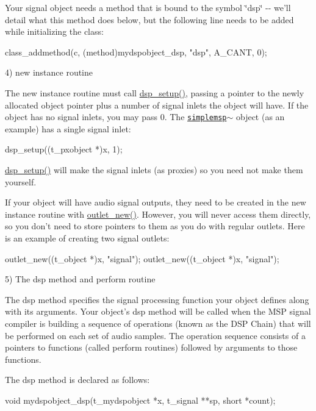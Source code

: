 Your signal object needs a method that is bound to the symbol \char`\"{}dsp\char`\"{} -\/-\/ we'll detail what this method does below, but the following line needs to be added while initializing the class: 
\begin{DoxyCode}
        class_addmethod(c, (method)mydspobject_dsp, "dsp", A_CANT, 0);
\end{DoxyCode}


4) new instance routine

The new instance routine must call \hyperlink{group__msp_gad15f054306792846a00a5f4e9e5426be}{dsp\_\-setup()}, passing a pointer to the newly allocated object pointer plus a number of signal inlets the object will have. If the object has no signal inlets, you may pass 0. The \href{simplemsp~_8c-source.html}{\tt simplemsp$\sim$} object (as an example) has a single signal inlet: 
\begin{DoxyCode}
        dsp_setup((t_pxobject *)x, 1);
\end{DoxyCode}


\hyperlink{group__msp_gad15f054306792846a00a5f4e9e5426be}{dsp\_\-setup()} will make the signal inlets (as proxies) so you need not make them yourself.

If your object will have audio signal outputs, they need to be created in the new instance routine with \hyperlink{group__inout_ga451b3a1ec203ac8648a5399e209f070a}{outlet\_\-new()}. However, you will never access them directly, so you don't need to store pointers to them as you do with regular outlets. Here is an example of creating two signal outlets: 
\begin{DoxyCode}
        outlet_new((t_object *)x, "signal");
        outlet_new((t_object *)x, "signal");
\end{DoxyCode}


5) The dsp method and perform routine

The dsp method specifies the signal processing function your object defines along with its arguments. Your object's dsp method will be called when the MSP signal compiler is building a sequence of operations (known as the DSP Chain) that will be performed on each set of audio samples. The operation sequence consists of a pointers to functions (called perform routines) followed by arguments to those functions.

The dsp method is declared as follows: 
\begin{DoxyCode}
    void mydspobject_dsp(t_mydspobject *x, t_signal **sp, short *count);
\end{DoxyCode}


